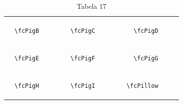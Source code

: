 \documentclass[x11names]{article}
\begin{document}
\begin{table}[H]
\begin{tabular}{|c|c|c|c|c|c|}
		&\multirow{5}{*}{	\fcPigB	[scale=0.16]} & &\multirow{5}{*}{	\fcPigC	[scale=0.16]} & &\multirow{5}{*}{	\fcPigD	[scale=0.16]}\\	& & & & & \\	& & & & & \\	\verb|	\fcPigB	| & & \verb|	\fcPigC	| & & \verb|	\fcPigD	| & \\	& & & & & \\	& & & & & \\	& & & & & \\	\hline									
		&\multirow{5}{*}{	\fcPigE	[scale=0.16]} & &\multirow{5}{*}{	\fcPigF	[scale=0.16]} & &\multirow{5}{*}{	\fcPigG	[scale=0.16]}\\	& & & & & \\	& & & & & \\	\verb|	\fcPigE	| & & \verb|	\fcPigF	| & & \verb|	\fcPigG	| & \\	& & & & & \\	& & & & & \\	& & & & & \\	\hline									
		&\multirow{5}{*}{	\fcPigH	[scale=0.16]} & &\multirow{5}{*}{	\fcPigI	[scale=0.16]} & &\multirow{5}{*}{	\fcPillow	[scale=0.16]}\\	& & & & & \\	& & & & & \\	\verb|	\fcPigH	| & & \verb|	\fcPigI	| & & \verb|	\fcPillow	| & \\	& & & & & \\	& & & & & \\	& & & & & \\		\hline 	\hline 	\end{tabular}	\caption{	Tabela 17	}\label{	Tab17	}\end{table}
\end{document}
